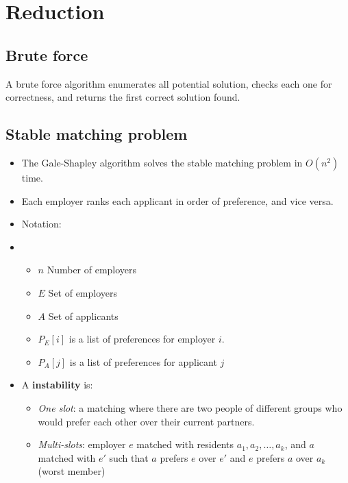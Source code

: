 \section{Reduction}

\subsection{Brute force}

A brute force algorithm enumerates all potential solution, checks each one for correctness, and returns the first correct solution found.

\subsection{Stable matching problem}

\begin{itemize}
    \item The Gale-Shapley algorithm solves the stable matching problem in $O(n^2)$ time.
    \item Each employer ranks each applicant in order of preference, and vice versa.
    \item Notation:
    \item \begin{itemize}
              \item $n$ Number of employers
              \item $E$ Set of employers
              \item $A$ Set of applicants
              \item $P_E[i]$ is a list of preferences for employer $i$.
              \item $P_A[j]$ is a list of preferences for applicant $j$
          \end{itemize}
    \item A \textbf{instability} is:
          \begin{itemize}
              \item \textit{One slot}: a matching where there are two people of different groups who would prefer each other over their current partners.
              \item \textit{Multi-slots}: employer $e$ matched with residents ${a_1, a_2, \ldots, a_k}$, and $a$ matched with $e'$ such that $a$ prefers $e$ over $e'$ and $e$ prefers $a$ over \textbf{$a_k$} (worst member)
          \end{itemize}
\end{itemize}

